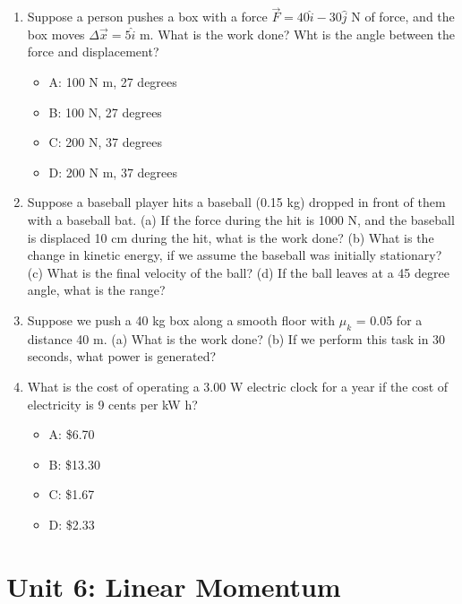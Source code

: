 \documentclass[10pt]{article}
\begin{document}
\begin{enumerate}
\item Suppose a person pushes a box with a force $\vec{F} = 40\hat{i} - 30\hat{j}$ N of force, and the box moves $\Delta\vec{x} = 5\hat{i}$ m. What is the work done?  Wht is the angle between the force and displacement?
\begin{itemize}
\item A: 100 N m, 27 degrees
\item B: 100 N, 27 degrees
\item C: 200 N, 37 degrees
\item D: 200 N m, 37 degrees 
\end{itemize}
\item  Suppose a baseball player hits a baseball (0.15 kg) dropped in front of them with a baseball bat. (a) If the force during the hit is 1000 N, and the baseball is displaced 10 cm during the hit, what is the work done? (b) What is the change in kinetic energy, if we assume the baseball was initially stationary? (c) What is the final velocity of the ball? (d) If the ball leaves at a 45 degree angle, what is the range? \\ \vspace{2.5cm}
\item  Suppose we push a 40 kg box along a smooth floor with $\mu_k$ = 0.05 for a distance 40 m. (a) What is the work done? (b) If we perform this task in 30 seconds, what power is generated? \\ \vspace{2.5cm}
\item What is the cost of operating a 3.00 W electric clock for a year if the cost of electricity is 9 cents per kW h?
\begin{itemize}
\item A: \$6.70
\item B: \$13.30
\item C: \$1.67
\item D: \$2.33
\end{itemize}
\end{enumerate}

\section{Unit 6: Linear Momentum}
\end{document}
